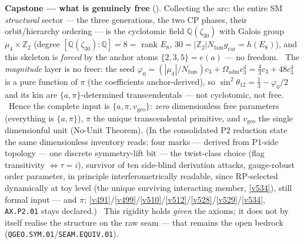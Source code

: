 \documentclass[11pt,a4paper]{article}
\newcommand{\cthree}{c_3}
\newcommand{\phiz}{\varphi_0}
\newcommand{\gcar}{g_{\mathrm{car}}}
\newcommand{\Nfam}{N_{\mathrm{fam}}}
\newcommand{\Z}{\mathbb Z}
\begin{document}
\par\smallskip\noindent\textbf{Capstone --- what is genuinely free} ().
Collecting the arc: the entire SM \emph{structural} sector --- the three generations, the two CP phases, their
orbit/hierarchy ordering --- is the cyclotomic field $\mathbb Q(\zeta_{30})$ with Galois group $\mu_4\times\Z_2$
(degree $[\mathbb Q(\zeta_{30}){:}\mathbb Q]=8=$ rank $E_8$, $30=|\Z_2|\Nfam\gcar=h(E_8)$), and this skeleton is
\emph{forced} by the anchor atoms $\{2,3,5\}=e(a)$ --- no freedom. \mE\ The \emph{magnitude} layer is no freer: the
seed $\phiz=(|\mu_4|/\Nfam)\cthree+\Omega_{\mathrm{adm}}\cthree^4=\tfrac43\cthree+48\cthree^4$ is a pure function of
$\pi$ (the coefficients anchor-derived), so $\sin^2\theta_{12}=\tfrac13-\phiz/2$ and its kin are
$\{a,\pi\}$-determined transcendentals --- not cyclotomic, not free. \mE\ Hence the complete input is
$\{a,\pi,v_{\mathrm{geo}}\}$: \emph{zero} dimensionless free parameters (everything is $\{a,\pi\}$), $\pi$ the unique
transcendental primitive, and $v_{\mathrm{geo}}$ the single dimensionful unit (No-Unit Theorem). (In the
consolidated P2 reduction state the same dimensionless inventory reads: four marks --- derived from
P1-side topology --- one discrete symmetry-lift bit --- the twist-class choice (flag transitivity
$\iff\tau=i$), survivor of ten side-blind derivation attacks, gauge-robust order parameter, in
principle interferometrically readable, since RP-selected dynamically at toy level (the unique
surviving interacting member, \vref{v534}), still formal input --- and $\pi$;
\vref{v491}/\vref{v499}/\vref{v510}/\vref{v512}/\vref{v528}/\vref{v529}/\vref{v534},
\texttt{AX.P2.01} stays declared.) \mO\ This rigidity
holds \emph{given} the axioms; it does not by itself realise the structure on the raw seam --- that remains the open
bedrock (\texttt{QGEO.SYM.01}/\texttt{SEAM.EQUIV.01}).
\end{document}

